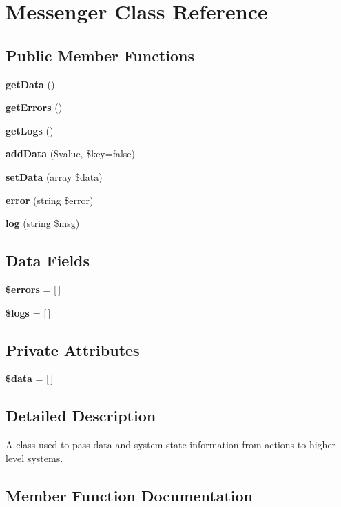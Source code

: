 \section{Messenger Class Reference}
\label{class_lora_1_1_messenger}
\subsection*{Public Member Functions}
\begin{DoxyCompactItemize}
\item 
\textbf{ get\+Data} ()
\item 
\textbf{ get\+Errors} ()
\item 
\textbf{ get\+Logs} ()
\item 
\textbf{ add\+Data} (\$value, \$key=false)
\item 
\textbf{ set\+Data} (array \$data)
\item 
\textbf{ error} (string \$error)
\item 
\textbf{ log} (string \$msg)
\end{DoxyCompactItemize}
\subsection*{Data Fields}
\begin{DoxyCompactItemize}
\item 
\mbox{\label{class_lora_1_1_messenger_ab24faf4aa647cdcee494fc48524ad4ff}} 
{\bfseries \$errors} = [$\,$]
\item 
\mbox{\label{class_lora_1_1_messenger_a1985bbbc5349038a012f02c97f5276e6}} 
{\bfseries \$logs} = [$\,$]
\end{DoxyCompactItemize}
\subsection*{Private Attributes}
\begin{DoxyCompactItemize}
\item 
\mbox{\label{class_lora_1_1_messenger_a6efc15b5a2314dd4b5aaa556a375c6d6}} 
{\bfseries \$data} = [$\,$]
\end{DoxyCompactItemize}


\subsection{Detailed Description}
A class used to pass data and system state information from actions to higher level systems. 

\subsection{Member Function Documentation}
\mbox{\label{class_lora_1_1_messenger_ae50fa30a5d787c06060bb4b759533d5d}} 
